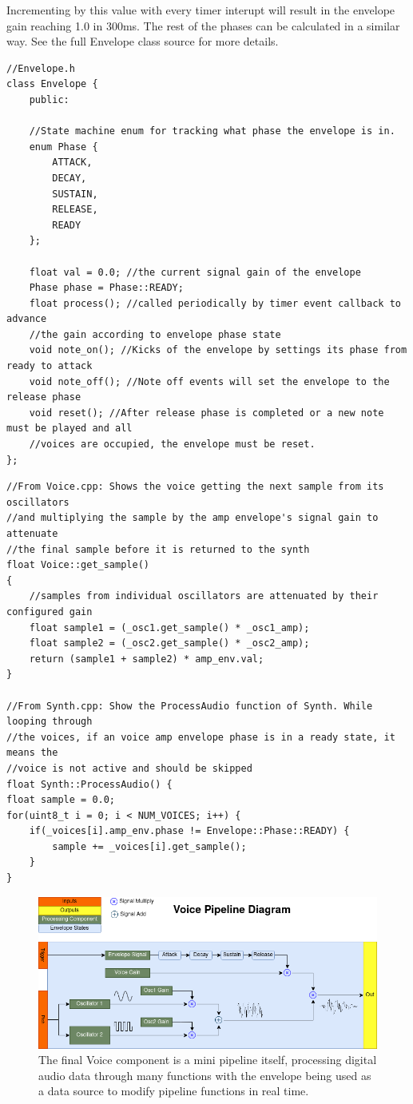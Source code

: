 \documentclass[acmlarge,screen]{acmart}
\begin{document}
	
	Incrementing by this value with every timer interupt will result in the envelope gain reaching 1.0 in 300ms. The rest of the phases can be calculated in a similar way. See the full Envelope class source for more details.
	
	\begin{verbatim}
//Envelope.h
class Envelope {
	public:
	
	//State machine enum for tracking what phase the envelope is in.
	enum Phase {
		ATTACK,
		DECAY,
		SUSTAIN,
		RELEASE,
		READY 
	};
	
	float val = 0.0; //the current signal gain of the envelope
	Phase phase = Phase::READY;
	float process(); //called periodically by timer event callback to advance
	//the gain according to envelope phase state
	void note_on(); //Kicks of the envelope by settings its phase from ready to attack
	void note_off(); //Note off events will set the envelope to the release phase
	void reset(); //After release phase is completed or a new note must be played and all
	//voices are occupied, the envelope must be reset.
};
	\end{verbatim}
	
	\begin{verbatim}
//From Voice.cpp: Shows the voice getting the next sample from its oscillators
//and multiplying the sample by the amp envelope's signal gain to attenuate
//the final sample before it is returned to the synth
float Voice::get_sample()
{   
	//samples from individual oscillators are attenuated by their configured gain
	float sample1 = (_osc1.get_sample() * _osc1_amp);
	float sample2 = (_osc2.get_sample() * _osc2_amp);
	return (sample1 + sample2) * amp_env.val;
}

//From Synth.cpp: Show the ProcessAudio function of Synth. While looping through
//the voices, if an voice amp envelope phase is in a ready state, it means the 
//voice is not active and should be skipped
float Synth::ProcessAudio() {
float sample = 0.0;
for(uint8_t i = 0; i < NUM_VOICES; i++) {
	if(_voices[i].amp_env.phase != Envelope::Phase::READY) {
		sample += _voices[i].get_sample();
	}
}
	\end{verbatim}

	\begin{figure}[H]
		\includegraphics[width=\linewidth]{Voice_Pipeline_Diagram}
		\caption{The final Voice component is a mini pipeline itself, processing digital audio data through many functions with the envelope being used as a data source to modify pipeline functions in real time.}
		\centering
	\end{figure}
	
\end{document}
